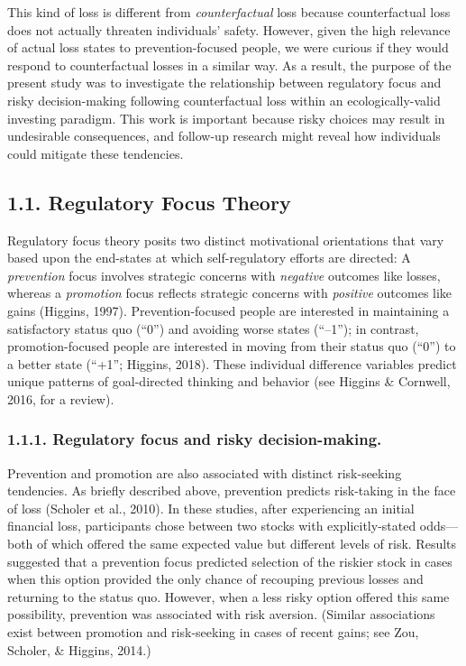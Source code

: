 \documentclass[man,floatsintext]{apa6}
\begin{document}
This kind of loss is different from \emph{counterfactual} loss because counterfactual loss does not actually threaten individuals' safety. However, given the high relevance of actual loss states to prevention-focused people, we were curious if they would respond to counterfactual losses in a similar way. As a result, the purpose of the present study was to investigate the relationship between regulatory focus and risky decision-making following counterfactual loss within an ecologically-valid investing paradigm. This work is important because risky choices may result in undesirable consequences, and follow-up research might reveal how individuals could mitigate these tendencies.

\hypertarget{regulatory-focus-theory}{%
\subsection{1.1. Regulatory Focus Theory}\label{regulatory-focus-theory}}

Regulatory focus theory posits two distinct motivational orientations that vary based upon the end-states at which self-regulatory efforts are directed: A \emph{prevention} focus involves strategic concerns with \emph{negative} outcomes like losses, whereas a \emph{promotion} focus reflects strategic concerns with \emph{positive} outcomes like gains (Higgins, 1997). Prevention-focused people are interested in maintaining a satisfactory status quo (\enquote{0}) and avoiding worse states (\enquote{--1}); in contrast, promotion-focused people are interested in moving from their status quo (\enquote{0}) to a better state (``+1''; Higgins, 2018). These individual difference variables predict unique patterns of goal-directed thinking and behavior (see Higgins \& Cornwell, 2016, for a review).

\hypertarget{regulatory-focus-and-risky-decision-making.}{%
\subsubsection{1.1.1. Regulatory focus and risky decision-making.}\label{regulatory-focus-and-risky-decision-making.}}

Prevention and promotion are also associated with distinct risk-seeking tendencies. As briefly described above, prevention predicts risk-taking in the face of loss (Scholer et al., 2010). In these studies, after experiencing an initial financial loss, participants chose between two stocks with explicitly-stated odds---both of which offered the same expected value but different levels of risk. Results suggested that a prevention focus predicted selection of the riskier stock in cases when this option provided the only chance of recouping previous losses and returning to the status quo. However, when a less risky option offered this same possibility, prevention was associated with risk aversion. (Similar associations exist between promotion and risk-seeking in cases of recent gains; see Zou, Scholer, \& Higgins, 2014.)
\end{document}
